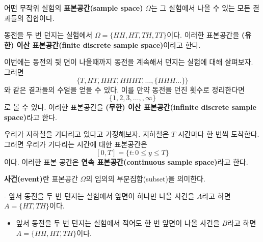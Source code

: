 \documentclass[b5paper,]{scrbook}
\providecommand{\tightlist}{%
  \setlength{\itemsep}{0pt}\setlength{\parskip}{0pt}}
\theoremstyle{plain}
\theoremstyle{definition}
\numberwithin{equation}{section}
\let\BeginKnitrBlock\begin \let\EndKnitrBlock\end
\begin{document}
\BeginKnitrBlock{definition}[표본공간]
\protect\hypertarget{def:unnamed-chunk-27}{}{\label{def:unnamed-chunk-27}
{} }어떤 무작위 실험의 \textbf{표본공간(sample
space)} \(\Omega\)는 그 실험에서 나올 수 있는 모든 결과들의 집합이다.
\EndKnitrBlock{definition}

\BeginKnitrBlock{example}[동전 던지기 실험]
\protect\hypertarget{exm:unnamed-chunk-28}{}{\label{exm:unnamed-chunk-28}
{} }동전을 두 번 던지는 실험에서
\(\Omega=\{ HH, HT, TH, TT \}\)이다. 이러한 표본공간을 \textbf{(유한)
이산 표본공간(finite discrete sample space)}이라고 한다.
\EndKnitrBlock{example}

\BeginKnitrBlock{example}[동전 계속 던지기 실험]
\protect\hypertarget{exm:unnamed-chunk-29}{}{\label{exm:unnamed-chunk-29}
{} }이번에는 동전의 뒷 면이
나올때까지 동전을 계속해서 던지는 실험에 대해 살펴보자. 그러면
\[\{ T, HT, HHT, HHHT, \ldots, \{ HHH\ldots\} \}\] 와 같은 결과들의
수얼을 얻을 수 있다. 이를 만약 동전을 던진 횟수로 정리한다면
\[\{ 1,2,3,\ldots, ,\infty\}\] 로 볼 수 있다. 이러한 표본공간을
\textbf{(무한) 이산 표본공간(infinite discrete sample space)}라고 한다.
\EndKnitrBlock{example}

\BeginKnitrBlock{example}[지하철 도착 시간]
\protect\hypertarget{exm:unnamed-chunk-30}{}{\label{exm:unnamed-chunk-30}
{} }우리가 지하철을 기다리고 있다고
가정해보자. 지하철은 \(T\) 시간마다 한 번씩 도착한다. 그러면 우리가
기다리는 시간에 대한 표본공간은 \[[0,T]=\{t:0\leq y \leq T\}\] 이다.
이러한 표본 공간은 \textbf{연속 표본공간(continuous sample space)}라고
한다.
\EndKnitrBlock{example}

\BeginKnitrBlock{definition}[사건]
\protect\hypertarget{def:unnamed-chunk-31}{}{\label{def:unnamed-chunk-31}
{} }\textbf{사건(event)}란 표본공간 \(\Omega\)의
임의의 부분집합(subset)을 의미한다.
\EndKnitrBlock{definition}

\BeginKnitrBlock{example}[사건의 예]
\protect\hypertarget{exm:unnamed-chunk-32}{}{\label{exm:unnamed-chunk-32}
{} }- 앞서 동전을 두 번 던지는 실험에서 앞면이
하나만 나올 사건을 \(A\)라고 하면 \(A=\{ HT, TH \}\)이다.

\begin{itemize}
\tightlist
\item
  앞서 동전을 두 번 던지는 실험에서 적어도 한 번 앞면이 나올 사건을
  \(B\)라고 하면 \(A=\{ HH, HT, TH \}\)이다.
\end{itemize}
\EndKnitrBlock{example}
\end{document}

